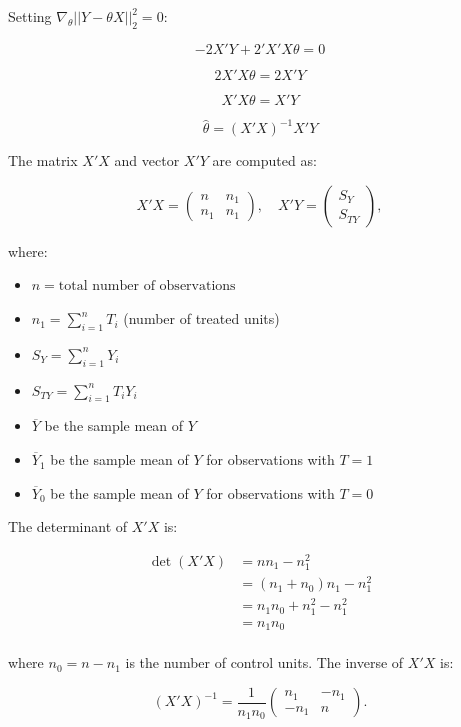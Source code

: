\documentclass{article}
\begin{document}
Setting $\nabla_{\theta} || Y - \theta X ||^2_2 = 0$:

$$
- 2  X' Y + 2 ' X' X \theta = 0
$$

$$
2 X' X \theta = 2  X' Y
$$

$$
X' X \theta =  X' Y
$$

$$
\hat{\theta} = (X' X)^{-1} X' Y
$$



The matrix \(X'X\) and vector \(X'Y\) are computed as:

\[
X'X = \begin{pmatrix}
n & n_1 \\
n_1 & n_1
\end{pmatrix},
\quad X'Y = \begin{pmatrix}
S_Y \\
S_{TY}
\end{pmatrix},
\]

where:
\begin{itemize}
  \item \(n = \text{total number of observations}\)
  \item \(n_1 = \sum_{i=1}^{n} T_i\) (number of treated units)
  \item \(S_Y = \sum_{i=1}^{n} Y_i\)
  \item \(S_{TY} = \sum_{i=1}^{n} T_i Y_i\)
  \item \( \overline{Y} \) be the sample mean of \( Y \)
  \item \( \overline{Y}_{1} \) be the sample mean of \( Y \) for observations with \( T = 1 \)
  \item \( \overline{Y}_{0} \) be the sample mean of \( Y \) for observations with \( T = 0 \)
\end{itemize}

The determinant of \(X'X\) is:

\begin{align*}
  \det(X'X) &= n n_1 - n_1^2 \\
            &= (n_1 + n_0) n_1 - n_1^2 \\
            &= n_1 n_0 + n_1^2 - n_1^2 \\
            &= n_1 n_0 \\
\end{align*}

where \(n_0 = n - n_1\) is the number of control units. The inverse of \(X'X\) is:

\[
(X'X)^{-1} = \frac{1}{n_1 n_0} \begin{pmatrix}
n_1 & -n_1 \\
- n_1 & n
\end{pmatrix}.
\]
\end{document}
